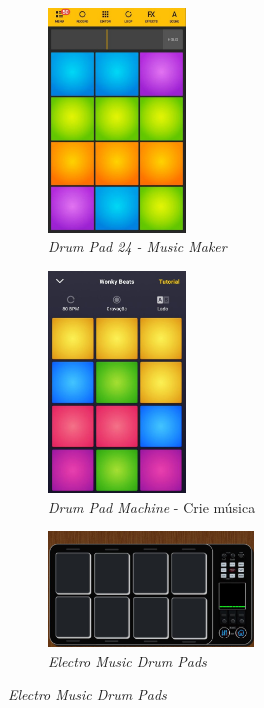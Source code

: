 \documentclass[12pt]{report}
\begin{document}
\begin{figure}[H]
  \centering
  \begin{subfigure}{0.4\textwidth}
    \centering
    \includegraphics[width=0.4\textwidth]{imagens/drumpads24.jpeg}
    \caption{{\it Drum Pad 24 - Music Maker}}
    \label{fig:emdp}
  \end{subfigure}
  \begin{subfigure}{0.4\textwidth}
    \centering
    \includegraphics[width=0.4\textwidth]{imagens/dpm.jpeg}
    \caption{{\it Drum Pad Machine} - Crie música}
    \label{fig:dpm}
  \end{subfigure}
  \begin{subfigure}{0.4\textwidth}
    \centering
    \includegraphics[width=0.6\textwidth]{imagens/emdp.jpeg}
    \caption{{\it Electro Music Drum Pads}}
    \label{fig:drumpads24}
  \end{subfigure}
\end{figure}
\end{document}
